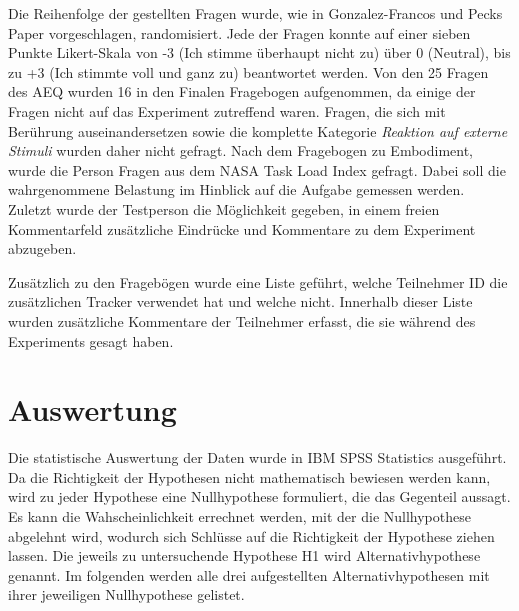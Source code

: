 Die Reihenfolge der gestellten Fragen wurde, wie in Gonzalez-Francos und Pecks Paper vorgeschlagen, randomisiert. Jede der Fragen konnte auf einer sieben Punkte Likert-Skala von -3 (Ich stimme überhaupt nicht zu) über 0 (Neutral), bis zu +3 (Ich stimmte voll und ganz zu) beantwortet werden.
Von den 25 Fragen des AEQ wurden 16 in den Finalen Fragebogen aufgenommen, da einige der Fragen nicht auf das Experiment zutreffend waren. Fragen, die sich mit Berührung auseinandersetzen sowie die komplette Kategorie \textit{Reaktion auf externe Stimuli} wurden daher nicht gefragt.
Nach dem Fragebogen zu Embodiment, wurde die Person Fragen aus dem NASA Task Load Index \cite{HART1988} gefragt. Dabei soll die wahrgenommene Belastung im Hinblick auf die Aufgabe gemessen werden.
Zuletzt wurde der Testperson die Möglichkeit gegeben, in einem freien Kommentarfeld zusätzliche Eindrücke und Kommentare zu dem Experiment abzugeben.

Zusätzlich zu den Fragebögen wurde eine Liste geführt, welche Teilnehmer ID die zusätzlichen Tracker verwendet hat und welche nicht. Innerhalb dieser Liste wurden zusätzliche Kommentare der Teilnehmer erfasst, die sie während des Experiments gesagt haben.


\section{Auswertung}
Die statistische Auswertung der Daten wurde in IBM SPSS Statistics ausgeführt. 
Da die Richtigkeit der Hypothesen nicht mathematisch bewiesen werden kann, wird zu jeder Hypothese eine Nullhypothese formuliert, die das Gegenteil aussagt. Es kann die Wahscheinlichkeit errechnet werden, mit der die Nullhypothese abgelehnt wird, wodurch sich Schlüsse auf die Richtigkeit der Hypothese ziehen lassen. Die jeweils zu untersuchende Hypothese H1 wird Alternativhypothese genannt. Im folgenden werden alle drei aufgestellten Alternativhypothesen mit ihrer jeweiligen Nullhypothese gelistet.

